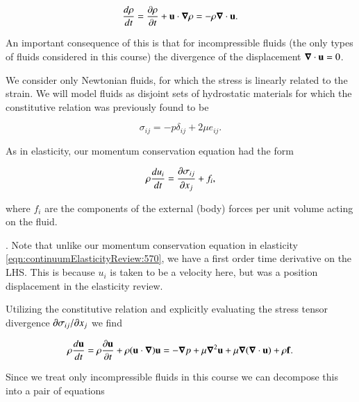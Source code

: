 \begin{equation}\label{eqn:continuumFluidsReview:1050}
\frac{d\rho}{dt} = \PD{t}{\rho} + \Bu \cdot \spacegrad \rho =
- \rho \spacegrad \cdot \Bu.
\end{equation}

An important consequence of this is that for incompressible fluids (the only types of fluids considered in this course) the divergence of the displacement $\spacegrad \cdot \Bu = 0$.


We consider only Newtonian fluids, for which the stress is linearly related to the strain.  We will model fluids as disjoint sets of hydrostatic materials for which the constitutive relation was previously found to be

\begin{equation}\label{eqn:continuumFluidsReview:1070}
\sigma_{ij} = - p \delta_{ij} + 2 \mu e_{ij}.
\end{equation}


As in elasticity, our momentum conservation equation had the form

\begin{equation}\label{eqn:continuumFluidsReview:1090}
\rho \frac{du_i}{dt} = \PD{x_j}{\sigma_{ij}} + f_i,
\end{equation}

where $f_i$ are the components of the external (body) forces per unit volume acting on the fluid.

.  Note that unlike our momentum conservation equation in elasticity \ref{eqn:continuumElasticityReview:570}, we have a first order time derivative on the LHS.  This is because $u_i$ is taken to be a velocity here, but was a position displacement in the elasticity review.

Utilizing the constitutive relation and explicitly evaluating the stress tensor divergence $\PDi{x_j}{\sigma_{ij}}$ we find

\begin{equation}\label{eqn:continuumFluidsReview:1110}
\rho \frac{d\Bu}{dt} 
=
\rho \PD{t}{\Bu} + \rho (\Bu \cdot \spacegrad) \Bu
= -\spacegrad p + \mu \spacegrad^2 \Bu
+ \mu \spacegrad (\spacegrad \cdot \Bu) + \rho \Bf.
\end{equation}

Since we treat only incompressible fluids in this course we can decompose this into a pair of equations


